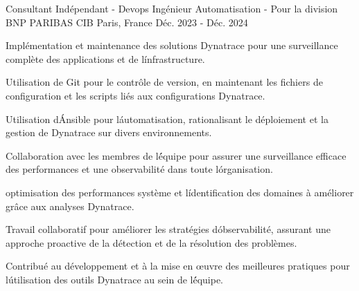 

\begin{cventries}

  \cventry
    {Consultant Indépendant - Devops  Ingénieur Automatisation - }  %
    {Pour la division BNP PARIBAS CIB} %
    {Paris, France} %
    {Déc. 2023 - Déc. 2024} %
    {
      \begin{cvitems} %
        \item {Implémentation et maintenance des solutions Dynatrace pour une surveillance complète des applications et de l\' infrastructure.}
        \item {Utilisation de Git pour le contrôle de version, en maintenant les fichiers de configuration et les scripts liés aux configurations Dynatrace.}
        \item {Utilisation d\' Ansible pour l\' automatisation, rationalisant le déploiement et la gestion de Dynatrace sur divers environnements.}
        \item {Collaboration avec les membres de l\' équipe pour assurer une surveillance efficace des performances et une observabilité dans toute l\' organisation.}
        \item {optimisation des performances système et l\' identification des domaines à améliorer grâce aux analyses Dynatrace.}
        \item {Travail collaboratif pour améliorer les stratégies d\' observabilité, assurant une approche proactive de la détection et de la résolution des problèmes.}
        \item {Contribué au développement et à la mise en œuvre des meilleures pratiques pour l\' utilisation des outils Dynatrace au sein de l\' équipe.}
      \end{cvitems}
    }


\end{cventries}
